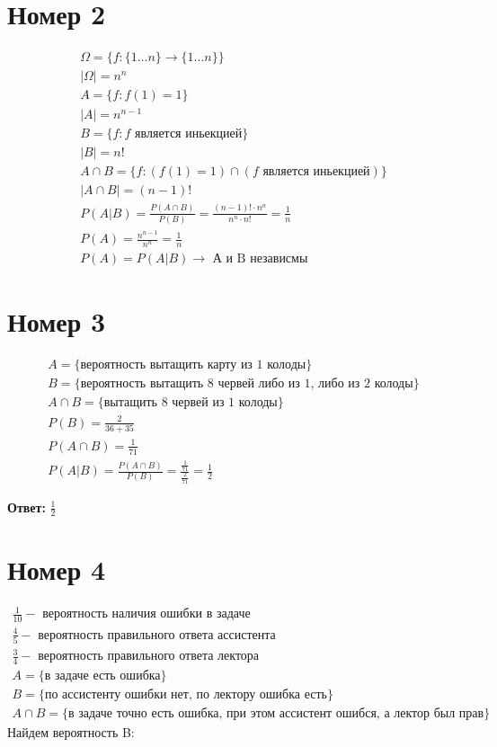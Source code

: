 \section*{Номер 2}
\begin{equation*}
\begin{gathered}
\Omega = \{ f : \{1 \ldots n\} \rightarrow \{1 \ldots n\}\} \\
|\Omega| = n^n \\
A = \{f : f(1) = 1\} \\
|A| = n^{n-1} \\
B = \{f : f \text{ является иньекцией}\} \\
|B| = n! \\
A \cap B = \{f : (f(1) = 1) \cap (f \text{ является иньекцией})\} \\
|A \cap B| = (n-1)!\\
P(A|B) = \frac{P(A\cap B)}{P(B)} = \frac{(n-1)! \cdot n^n}{n^n \cdot n!} = \frac{1}{n} \\
P(A) = \frac{n^{n-1}}{n^n} = \frac{1}{n} \\
P(A) = P(A|B) \rightarrow \text{ А и B независмы }
\end{gathered}
\end{equation*}
\section*{Номер 3}
\begin{equation*}
\begin{gathered}
A = \{\text{вероятность вытащить карту из 1 колоды}\} \\
B = \{\text{вероятность вытащить 8 червей либо из 1, либо из 2 колоды}\}\\
A \cap B = \{ \text{вытащить 8 червей из 1 колоды} \} \\
P(B) = \frac{2}{36+35}\\
P(A \cap B) = \frac{1}{71}\\
P(A|B) = \frac{P(A\cap B)}{P(B)} = \frac{\frac{1}{71}}{\frac{2}{71}} = \frac{1}{2}
\end{gathered}
\end{equation*}
\begin{center}
\textbf{Ответ: } $\frac{1}{2}$
\end{center}
\section*{Номер 4}
\begin{equation*}
\begin{gathered}
\frac{1}{10} - \text{ вероятность наличия ошибки в задаче} \\
\frac{4}{5} - \text{ вероятность правильного ответа ассистента} \\
\frac{3}{4} - \text{ вероятность правильного ответа лектора}\\
A  = \{\text{в задаче есть ошибка}\} \\
B = \{\text{по ассистенту ошибки нет, по лектору ошибка есть}\} \\
A \cap B = \{\text{в задаче  точно есть ошибка, при этом ассистент ошибся, а лектор был прав}\}
\end{gathered} 
\end{equation*}
Найдем вероятность B: 

